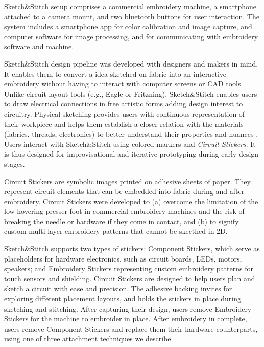 \documentclass[header.tex]{subfiles}
\begin{document}
Sketch\&Stitch setup comprises a commercial embroidery machine, a smartphone attached to a camera mount, and two bluetooth buttons for user interaction. The system includes a smartphone app for color calibration and image capture, and computer software for image processing, and for communicating with embroidery software and machine.

Sketch\&Stitch design pipeline was developed with designers and makers in mind. %
It enables them to convert a idea sketched on fabric into an interactive embroidery without having to interact with computer screens or CAD tools. Unlike circuit layout tools (e.g., Eagle or Fritzning), Sketch\&Stitch enables users to draw electrical connections in free artistic forms adding design interest to circuitry. Physical sketching provides users with continuous representation of their workpiece and helps them establish a closer relation with the materials (fabrics, threads, electronics) to better understand their properties and nuances \cite{}. Users interact with Sketch\&Stitch using colored markers and \textit{Circuit Stickers}. It is thus designed for improvisational and iterative prototyping during early design stages. 

 



Circuit Stickers are symbolic images printed on adhesive sheets of paper. %
They represent circuit elements that can be embedded into fabric during and after embroidery. Circuit Stickers were developed to (a) overcome the limitation of the low hovering presser foot in commercial embroidery machines and the risk of breaking the needle or hardware if they come in contact, and (b) to signify custom multi-layer embroidery patterns that cannot be skecthed in 2D.

Sketch\&Stitch supports two types of stickers: Component Stickers, which serve as placeholders for hardware electronics, such as circuit boards, LEDs, motors, speakers; and Embroidery Stickers representing custom embroidery patterns for touch sensors and shielding. Circuit Stickers are designed to help users plan and sketch a circuit with ease and precision. The adhesive backing invites for exploring different placement layouts, and holds the stickers in place during sketching and stitching. After capturing their design, users remove Embroidery Stickers for the machine to embroider in place. After embroidery in complete, users remove Component Stickers and replace them their hardware counterparts, using one of three attachment techniques we describe.
\end{document}
